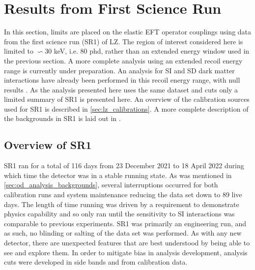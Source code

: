 \section{Results from First Science Run}
\par
In this section, limits are placed on the elastic EFT operator couplings using data from the first science run (SR1) of LZ.
The region of interest considered here is limited to $\backsim$30 keV, i.e. 80 phd, rather than an extended energy window used in the previous section.
A more complete analysis using an extended recoil energy range is currently under preparation.
An analysis for SI and SD dark matter interactions have already been performed in this recoil energy range, with null results \cite{lz_ws_sr1_ref}.
As the analysis presented here uses the same dataset and cuts only a limited summary of SR1 is presented here.
An overview of the calibration sources used for SR1 is described in \autoref{sec:lz_calibrations}.
A more complete description of the backgrounds in SR1 is laid out in \cite{lz_sr1_backgrounds_ref}.

\subsection{Overview of SR1}
\par
SR1 ran for a total of 116 days from 23 December 2021 to 18 April 2022 during which time the detector was in a stable running state.
As was mentioned in \autoref{sec:od_analysis_backgrounds}, several interruptions occurred for both calibration runs and system maintenance reducing the data set down to 89 live days.
The length of time running was driven by a requirement to demonstrate physics capability and so only ran until the sensitivity to SI interactions was comparable to previous experiments.
SR1 was primarily an engineering run, and as such, no blinding or salting of the data set was performed.
As with any new detector, there are unexpected features that are best understood by being able to see and explore them.
In order to mitigate bias in analysis development, analysis cuts were developed in side bands and from calibration data.


